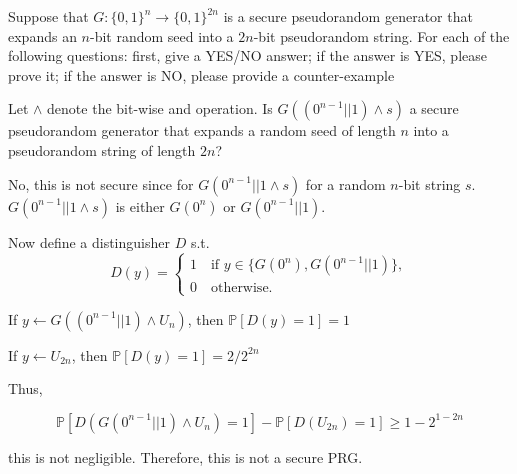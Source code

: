 \documentclass[12pt, letterpaper]{article}
\renewcommand{\P}{\mathbb{P}}
\renewcommand{\t}[1]{\text{#1}}
\begin{document}
\color{\TextColor}
\pagecolor{\colormode}
\setlength{\parindent}{0pt}
\pagestyle{fancy}
\fancyhf{}

\begin{problem}{}
    Suppose that $G : \{0, 1\}^n \to \{0, 1\}^{2n}$ is a secure pseudorandom generator
that expands an $n$-bit random seed into a $2n$-bit pseudorandom string. For each of the
following questions: first, give a YES/NO answer; if the answer is YES, please prove it; if
the answer is NO, please provide a counter-example
\end{problem}

\begin{subproblem}{}
    Let $\wedge$ denote the bit-wise and operation. Is $G((0^{n-1}|| 1) \wedge s)$ a secure pseudorandom
generator that expands a random seed of length $n$ into a pseudorandom string of
length $2n$?
\end{subproblem}
\begin{problemproof}
    No, this is not secure since for $G(0^{n-1}||1 \wedge s)$ for a random $n$-bit string $s$. $G(0^{n-1}||1 \wedge s)$ is either
    $G(0^n)$ or $G(0^{n-1}||1)$.

    Now define a distinguisher $D$ s.t.
    \[D(y)=\begin{cases*}
        1 \quad \t{if } y \in \{G(0^n), G(0^{n-1}||1)\},\\
        0 \quad \t{otherwise.}
    \end{cases*}\]

    If $y \leftarrow G((0^{n-1}|| 1) \wedge U_n)$, then $\P[D(y)=1]=1$

    If $y \leftarrow U_{2n}$, then $\P[D(y)=1] = 2/2^{2n}$

    Thus,

    \[\P[D(G(0^{n-1}|| 1) \wedge U_n)=1] - \P[D(U_{2n})=1] \geq 1-2^{1-2n}\]

    this is not negligible. Therefore, this is not a secure PRG.
\end{problemproof}
\end{document}
